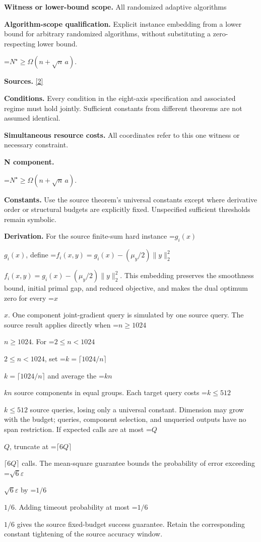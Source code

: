 \documentclass[10pt,a4paper]{article}
\newcommand{\AtlasMath}[1]{\par\begingroup\centering\setbox0=\hbox{$\displaystyle #1$}\ifdim\wd0>1.4\linewidth\typeout{ATLAS WIDE FORMULA: \the\wd0}\fi\ifdim\wd0>\linewidth\resizebox{\linewidth}{!}{\box0}\else\box0\fi\par\endgroup}
\newcommand{\AtlasInlineMath}[1]{\begingroup\setbox0=\hbox{$#1$}\ifdim\wd0>.4\linewidth\endgroup\AtlasMath{#1}\else\endgroup$#1$\fi}
\begin{document}
\textbf{Witness or lower-bound scope.} All randomized adaptive algorithms



\textbf{Algorithm-scope qualification.} Explicit instance embedding from a lower bound for arbitrary randomized algorithms, without substituting a zero-respecting lower bound.



\AtlasMath{N^\star\ge\Omega(n+\sqrt n\,a).}


\textbf{Sources.} \href{https://arxiv.org/pdf/2609.00045v3}{[2]}



\textbf{Conditions.} Every condition in the eight-axis specification and associated regime must hold jointly. Sufficient constants from different theorems are not assumed identical.



\textbf{Simultaneous resource costs.} All coordinates refer to this one witness or necessary constraint.



\textbf{N component.}



\AtlasMath{N^\star\ge\Omega(n+\sqrt n\,a).}


\textbf{Constants.} Use the source theorem’s universal constants except where derivative order or structural budgets are explicitly fixed. Unspecified sufficient thresholds remain symbolic.



\textbf{Derivation.} For the source finite-sum hard instance \AtlasInlineMath{g_i(x)}, define \AtlasInlineMath{f_i(x,y)=g_i(x)-(\mu_y/2)\|y\|_2^2}. This embedding preserves the smoothness bound, initial primal gap, and reduced objective, and makes the dual optimum zero for every \AtlasInlineMath{x}. One component joint-gradient query is simulated by one source query. The source result applies directly when \AtlasInlineMath{n\ge1024}. For \AtlasInlineMath{2\le n<1024}, set \AtlasInlineMath{k=\lceil1024/n\rceil} and average the \AtlasInlineMath{kn} source components in equal groups. Each target query costs \AtlasInlineMath{k\le512} source queries, losing only a universal constant. Dimension may grow with the budget; queries, component selection, and unqueried outputs have no span restriction. If expected calls are at most \AtlasInlineMath{Q}, truncate at \AtlasInlineMath{\lceil6Q\rceil} calls. The mean-square guarantee bounds the probability of error exceeding \AtlasInlineMath{\sqrt6\varepsilon} by \AtlasInlineMath{1/6}. Adding timeout probability at most \AtlasInlineMath{1/6} gives the source fixed-budget success guarantee. Retain the corresponding constant tightening of the source accuracy window.
\end{document}
